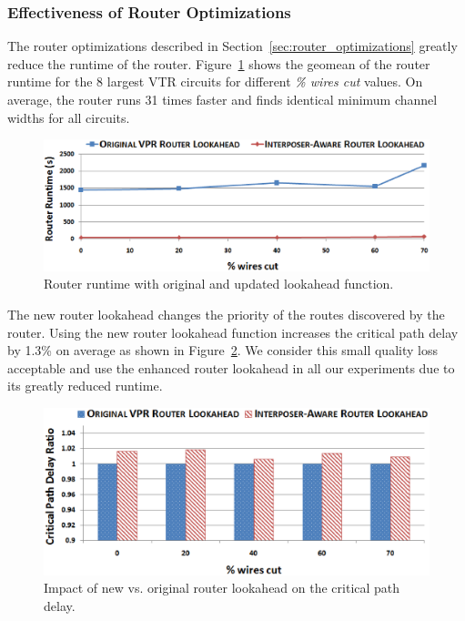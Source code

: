 \documentclass[journal]{IEEEtran}
\begin{document}
\subsubsection{Effectiveness of Router Optimizations}
\label{sec:effectiveness_of_router_enhancements}
The router optimizations described in Section~\ref{sec:router_optimizations} greatly reduce the runtime of the router. Figure~\ref{fig:lookahead_runtime} shows the geomean of the router runtime for the 8 largest VTR circuits for different \textit{\% wires cut} values. On average, the router runs 31 times faster and finds identical minimum channel widths for all circuits.

\begin{figure}[!hb]
\centering
\includegraphics[width=\linewidth]{router_opt.eps}
\caption{Router runtime with original and updated lookahead function.}
\label{fig:lookahead_runtime}
\end{figure}

The new router lookahead changes the priority of the routes discovered by the router. Using the new router lookahead function increases the critical path delay by 1.3\% on average as shown in Figure~\ref{fig:lookahead_fmax}. We consider this small quality loss acceptable and use the enhanced router lookahead in all our experiments due to its greatly reduced runtime.

\begin{figure}[!hb]
\centering
\includegraphics[width=\linewidth]{router_opt_fmax.eps}
\caption{Impact of new vs. original router lookahead on the critical path delay.}
\label{fig:lookahead_fmax}
\end{figure}
\end{document}
